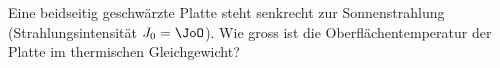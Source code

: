 Eine beidseitig geschwärzte Platte steht senkrecht zur Sonnenstrahlung (Strahlungsintensität $J_0 = \JoO$). Wie gross ist die Oberflächentemperatur der Platte im thermischen Gleichgewicht?
